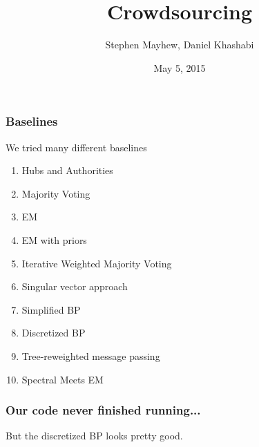 \documentclass[10pt, compress]{beamer}
\title{Crowdsourcing}
\subtitle{}
\date{May 5, 2015}
\author{Stephen Mayhew, Daniel Khashabi}
\institute{University of Illinois at Urbana Champaign}
\begin{document}
\maketitle

\begin{frame}[fragile]
  \frametitle{Baselines}
  
  We tried many different baselines
  
  \begin{enumerate}
  \item Hubs and Authorities
  \item Majority Voting
  \item EM
  \item EM with priors
  \item Iterative Weighted Majority Voting
  \item Singular vector approach
  \item Simplified BP
  \item Discretized BP
  \item Tree-reweighted message passing
  \item Spectral Meets EM
  \end{enumerate}



\end{frame}


\begin{frame}[fragile]
  \frametitle{Our code never finished running...}

But the discretized BP looks pretty good.

\end{frame}


\end{document}
